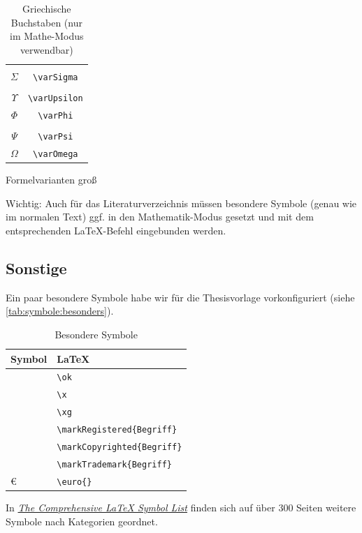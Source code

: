 \begin{table}[ht]
\begin{subtable}[b]{0.24\linewidth}
\begin{tabular}{c|c}
						&\\
						$\varSigma$ & \lstinline|\varSigma|\\
						&\\
						$\varUpsilon$ & \lstinline|\varUpsilon|\\
						$\varPhi$ & \lstinline|\varPhi|\\
						&\\
						$\varPsi$ & \lstinline|\varPsi|\\
						$\varOmega$ & \lstinline|\varOmega|
					\end{tabular}
					\caption{Formelvarianten groß}
				\end{subtable}
								
				\caption[Griechische Buchstaben]{Griechische Buchstaben (nur im Mathe-Modus verwendbar)}
				\label{tab:symbole:griechisch}
			\end{table}
			
			Wichtig: Auch für das Literaturverzeichnis müssen besondere Symbole (genau wie im normalen Text) ggf. in den Mathematik-Modus gesetzt und mit dem entsprechenden \LaTeX-Befehl eingebunden werden.
		
		\subsection{Sonstige}
			Ein paar besondere Symbole habe wir für die Thesisvorlage vorkonfiguriert (siehe \autoref{tab:symbole:besonders}).
			\begin{table}[h]
				\begin{tabular}{l|l}
					Symbol & \LaTeX\\\hline
					\ok							& \lstinline|\ok|\\
					\x							& \lstinline|\x|\\
					\xg							& \lstinline|\xg|\\
					\markRegistered{Begriff}	& \lstinline|\markRegistered{Begriff}|\\
					\markCopyrighted{Begriff}	& \lstinline|\markCopyrighted{Begriff}|\\
					\markTrademark{Begriff}		& \lstinline|\markTrademark{Begriff}|\\
					\euro{}						& \lstinline|\euro{}|\\
				\end{tabular}
				\caption{Besondere Symbole}
				\label{tab:symbole:besonders}
			\end{table}
		
			In \href{http://tug.ctan.org/info/symbols/comprehensive/symbols-a4.pdf}{\emph{The Comprehensive \LaTeX{} Symbol List}} finden sich auf über 300 Seiten weitere Symbole nach Kategorien geordnet.
\clearpage
